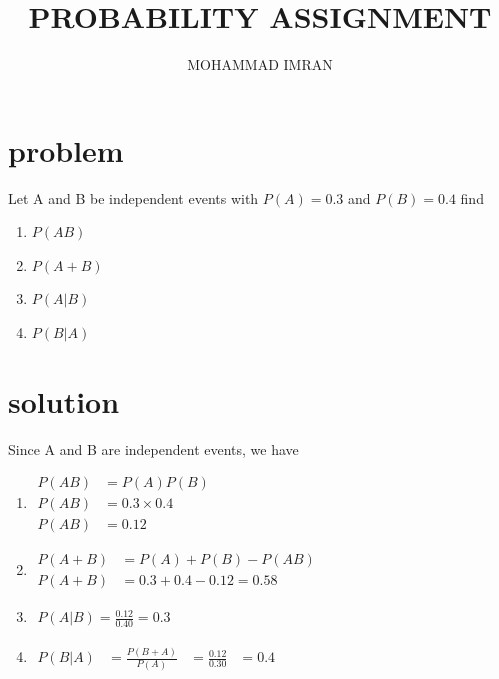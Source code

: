 \documentclass[journal,12pt,twocolumn]{article}
\title{PROBABILITY ASSIGNMENT}
\author{MOHAMMAD IMRAN}
\begin{document}
\maketitle
\bigskip

\section{problem }

Let A and B be independent events with $P(A)=0.3$ and $P(B)=0.4$ find 
\begin{enumerate}

\item$P(AB)$
\item$P(A+B)$ 
\item$P(A | B)$   
\item$P(B | A)$
       \end{enumerate}
\section{solution }  


Since A and B are independent events, we have 

\begin{enumerate}

\item $\begin{aligned}
 P(AB)&=P(A) P(B)&\\
P(AB)&=0.3 \times 0.4&\\
P(AB)&=0.12&
\end{aligned}$


\item $\begin{aligned}
P(A+B)&=P(A)+P(B)-P(AB)&\\
P(A+B)&=0.3+0.4-0.12=0.58&
\end{aligned}$


\item $\begin{aligned}
P(A | B)=\frac{0.12}{0.40}=0.3
\end{aligned}$
\item $\begin{aligned}
P(B | A)&=\frac{P(B+A)}{P(A)}&=\frac{0.12}{0.30}&=0.4&
\end{aligned}$
\end{enumerate}
\end{document}
